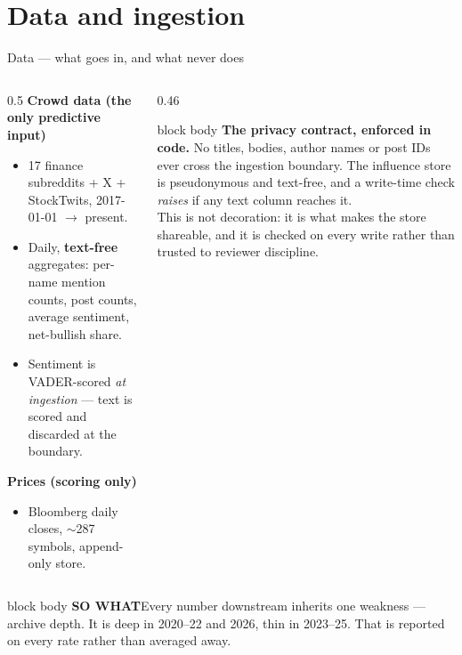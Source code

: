 \documentclass[aspectratio=169,11pt]{beamer}
\newcommand{\sowhatfont}{\footnotesize}
\newcommand{\sowhat}[1]{%
  \vspace{0.3em}
  \begin{beamercolorbox}[wd=\linewidth,sep=0.55em]{block body}
    {\sowhatfont\textbf{\color{gicnavy}SO WHAT}\quad #1}
  \end{beamercolorbox}}
\begin{document}
\section{Data and ingestion}
\begin{frame}{Data --- what goes in, and what never does}
  \begin{columns}[T]
    \begin{column}{0.5\linewidth}
      \footnotesize
      \textbf{Crowd data (the only predictive input)}
      \begin{itemize}
        \item 17 finance subreddits + X + StockTwits, 2017-01-01
          $\rightarrow$ present.
        \item Daily, \textbf{text-free} aggregates: per-name mention counts,
          post counts, average sentiment, net-bullish share.
        \item Sentiment is VADER-scored \emph{at ingestion} --- text is scored
          and discarded at the boundary.
      \end{itemize}
      \vspace{0.5em}
      \textbf{Prices (scoring only)}
      \begin{itemize}
        \item Bloomberg daily closes, $\sim$287 symbols, append-only store.
      \end{itemize}
    \end{column}
    \begin{column}{0.46\linewidth}
      \begin{beamercolorbox}[wd=\linewidth,sep=0.8em]{block body}
        \footnotesize
        \textbf{\color{gicnavy}The privacy contract, enforced in code.}
        No titles, bodies, author names or post IDs ever cross the ingestion
        boundary. The influence store is pseudonymous and text-free, and a
        write-time check \emph{raises} if any text column reaches it.
        \\[0.5em]
        This is not decoration: it is what makes the store shareable, and it
        is checked on every write rather than trusted to reviewer discipline.
      \end{beamercolorbox}
    \end{column}
  \end{columns}
  \sowhat{Every number downstream inherits one weakness --- archive depth. It
    is deep in 2020--22 and 2026, thin in 2023--25. That is reported on every
    rate rather than averaged away.}
\end{frame}
\end{document}
